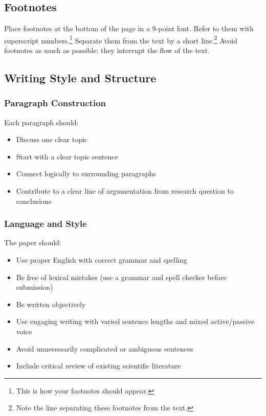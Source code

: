 \subsection{Footnotes}
Place footnotes at the bottom of the page in a 9-point font. Refer to
them with superscript numbers.\footnote{This is how your footnotes
should appear.} Separate them from the text by a short
line.\footnote{Note the line separating these footnotes from the
text.} Avoid footnotes as much as possible; they interrupt the flow of
the text.

\subsection{Writing Style and Structure}
\subsubsection{Paragraph Construction}
Each paragraph should:
\begin{itemize}
\item Discuss one clear topic
\item Start with a clear topic sentence
\item Connect logically to surrounding paragraphs
\item Contribute to a clear line of argumentation from research question to conclusions
\end{itemize}

\subsubsection{Language and Style}
The paper should:
\begin{itemize}
\item Use proper English with correct grammar and spelling
\item Be free of lexical mistakes (use a grammar and spell checker before submission)
\item Be written objectively
\item Use engaging writing with varied sentence lengths and mixed active/passive voice
\item Avoid unnecessarily complicated or ambiguous sentences
\item Include critical review of existing scientific literature
\end{itemize}

